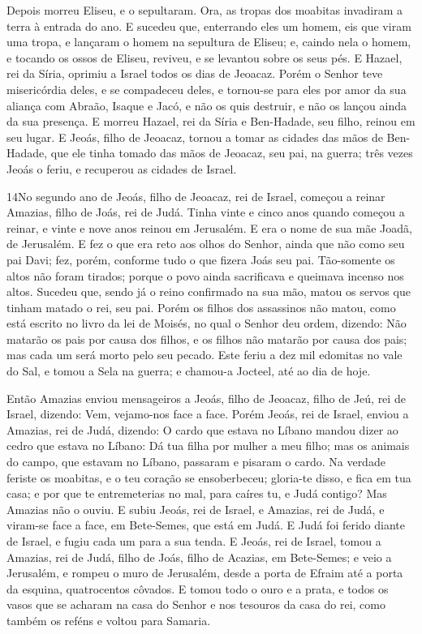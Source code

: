 Depois morreu Eliseu, e o sepultaram. Ora, as tropas dos moabitas
invadiram a terra à entrada do ano. E sucedeu que, enterrando
eles um homem, eis que viram uma tropa, e lançaram o homem na
sepultura de Eliseu; e, caindo nela o homem, e tocando os ossos de
Eliseu, reviveu, e se levantou sobre os seus pés. E Hazael,
rei da Síria, oprimiu a Israel todos os dias de Jeoacaz.
Porém o Senhor teve misericórdia deles, e se compadeceu
deles, e tornou-se para eles por amor da sua aliança com Abraão,
Isaque e Jacó, e não os quis destruir, e não os lançou ainda da sua
presença. E morreu Hazael, rei da Síria e Ben-Hadade, seu
filho, reinou em seu lugar. E Jeoás, filho de Jeoacaz, tornou
a tomar as cidades das mãos de Ben-Hadade, que ele tinha tomado das
mãos de Jeoacaz, seu pai, na guerra; três vezes Jeoás o feriu, e
recuperou as cidades de Israel.

\medskip

\lettrine{14} No segundo ano de Jeoás, filho de Jeoacaz, rei
de Israel, começou a reinar Amazias, filho de Joás, rei de Judá.
Tinha vinte e cinco anos quando começou a reinar, e vinte e nove
anos reinou em Jerusalém. E era o nome de sua mãe Joadã, de
Jerusalém. E fez o que era reto aos olhos do Senhor, ainda que
não como seu pai Davi; fez, porém, conforme tudo o que fizera Joás
seu pai. Tão-somente os altos não foram tirados; porque o povo
ainda sacrificava e queimava incenso nos altos. Sucedeu que,
sendo já o reino confirmado na sua mão, matou os servos que tinham
matado o rei, seu pai. Porém os filhos dos assassinos não matou,
como está escrito no livro da lei de Moisés, no qual o Senhor deu
ordem, dizendo: Não matarão os pais por causa dos filhos, e os
filhos não matarão por causa dos pais; mas cada um será morto pelo
seu pecado. Este feriu a dez mil edomitas no vale do Sal, e
tomou a Sela na guerra; e chamou-a Jocteel, até ao dia de hoje.

Então Amazias enviou mensageiros a Jeoás, filho de Jeoacaz, filho
de Jeú, rei de Israel, dizendo: Vem, vejamo-nos face a face.
Porém Jeoás, rei de Israel, enviou a Amazias, rei de Judá,
dizendo: O cardo que estava no Líbano mandou dizer ao cedro que
estava no Líbano: Dá tua filha por mulher a meu filho; mas os
animais do campo, que estavam no Líbano, passaram e pisaram o cardo.
Na verdade feriste os moabitas, e o teu coração se
ensoberbeceu; gloria-te disso, e fica em tua casa; e por que te
entremeterias no mal, para caíres tu, e Judá contigo? Mas
Amazias não o ouviu. E subiu Jeoás, rei de Israel, e Amazias, rei de
Judá, e viram-se face a face, em Bete-Semes, que está em Judá.
E Judá foi ferido diante de Israel, e fugiu cada um para a
sua tenda. E Jeoás, rei de Israel, tomou a Amazias, rei de
Judá, filho de Joás, filho de Acazias, em Bete-Semes; e veio a
Jerusalém, e rompeu o muro de Jerusalém, desde a porta de Efraim até
a porta da esquina, quatrocentos côvados. E tomou todo o ouro
e a prata, e todos os vasos que se acharam na casa do Senhor e nos
tesouros da casa do rei, como também os reféns e voltou para
Samaria.

